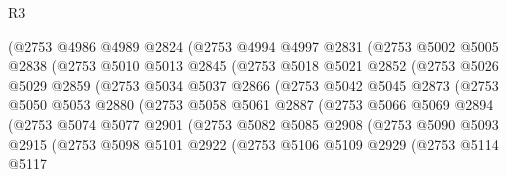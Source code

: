 \begin{lexlean}{R3}
\begin{coremodule}
                (@2753
                  @4986
                  @4989
                  @2824
                  (@2753
                    @4994
                    @4997
                    @2831
                    (@2753
                      @5002
                      @5005
                      @2838
                      (@2753
                        @5010
                        @5013
                        @2845
                        (@2753
                          @5018
                          @5021
                          @2852
                          (@2753
                            @5026
                            @5029
                            @2859
                            (@2753
                              @5034
                              @5037
                              @2866
                              (@2753
                                @5042
                                @5045
                                @2873
                                (@2753
                                  @5050
                                  @5053
                                  @2880
                                  (@2753
                                    @5058
                                    @5061
                                    @2887
                                    (@2753
                                      @5066
                                      @5069
                                      @2894
                                      (@2753
                                        @5074
                                        @5077
                                        @2901
                                        (@2753
                                          @5082
                                          @5085
                                          @2908
                                          (@2753
                                            @5090
                                            @5093
                                            @2915
                                            (@2753
                                              @5098
                                              @5101
                                              @2922
                                              (@2753
                                                @5106
                                                @5109
                                                @2929
                                                (@2753
                                                  @5114
                                                  @5117

\end{coremodule}
\end{lexlean}
